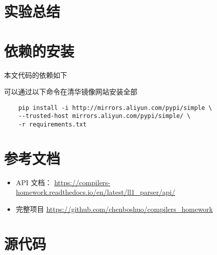 \documentclass[pdfCover]{myreport} %
\begin{document}
\section{实验总结}
  





\begin{appendices}
  \section{依赖的安装}
    本文代码的依赖如下
    
    可以通过以下命令在清华镜像网站安装全部
    \begin{lstlisting}
    pip install -i http://mirrors.aliyun.com/pypi/simple \
    --trusted-host mirrors.aliyun.com/pypi/simple/ \
    -r requirements.txt
    \end{lstlisting}
  \section{参考文档}
    \begin{itemize}
      \item API 文档： \url{https://compilers-homework.readthedocs.io/en/latest/ll1_parser/api/}
      \item 完整项目 \url{https://github.com/chenboshuo/compilers_homework}
    \end{itemize}
  \section{源代码}
    
\end{appendices}
\end{document}
